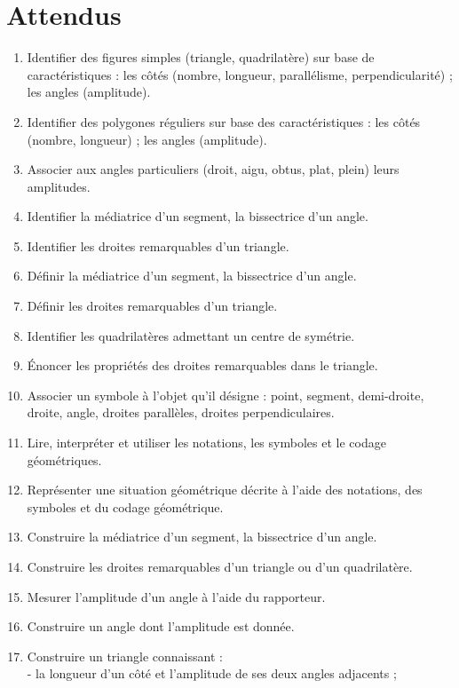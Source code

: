 \documentclass[../../syllabus_1.tex]{subfiles}
\begin{document}
\section*{Attendus}
\begin{enumerate}[label=\textbf{\arabic*.}]
   \item Identifier des figures simples (triangle, quadrilatère) sur base de caractéristiques : les côtés (nombre, longueur, parallélisme, perpendicularité) ; les angles (amplitude).
    \item Identifier des polygones réguliers sur base des caractéristiques : les côtés (nombre, longueur) ; les angles (amplitude).
    \item Associer aux angles particuliers (droit, aigu, obtus, plat, plein) leurs amplitudes.
    \item Identifier la médiatrice d'un segment, la bissectrice d'un angle.
    \item Identifier les droites remarquables d'un triangle.
    \item Définir la médiatrice d'un segment, la bissectrice d'un angle.
    \item Définir les droites remarquables d'un triangle.
    \item Identifier les quadrilatères admettant un centre de symétrie.
    \item Énoncer les propriétés des droites remarquables dans le triangle.
    \item Associer un symbole à l'objet qu'il désigne : point, segment, demi-droite, droite, angle, droites parallèles, droites perpendiculaires.
    \item Lire, interpréter et utiliser les notations, les symboles et le codage géométriques.
    \item Représenter une situation géométrique décrite à l'aide des notations, des symboles et du codage géométrique.
    \item Construire la médiatrice d'un segment, la bissectrice d'un angle.
    \item Construire les droites remarquables d'un triangle ou d'un quadrilatère.
    \item Mesurer l'amplitude d'un angle à l'aide du rapporteur.
    \item Construire un angle dont l'amplitude est donnée.
    \item Construire un triangle connaissant :\\
    - la longueur d'un côté et l'amplitude de ses deux angles adjacents ;\\

\end{enumerate}
\end{document}
